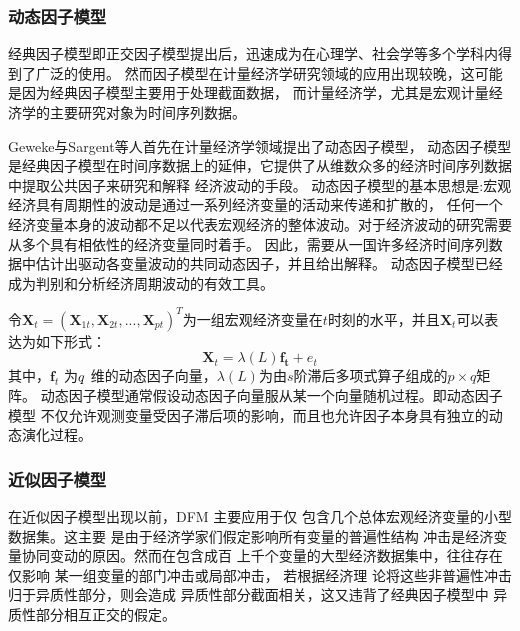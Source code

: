 
\subsubsection{动态因子模型}

经典因子模型即正交因子模型提出后，迅速成为在心理学、社会学等多个学科内得到了广泛的使用。
然而因子模型在计量经济学研究领域的应用出现较晚，这可能是因为经典因子模型主要用于处理截面数据，
而计量经济学，尤其是宏观计量经济学的主要研究对象为时间序列数据。

Geweke与Sargent等人首先在计量经济学领域提出了动态因子模型，
动态因子模型是经典因子模型在时间序数据上的延伸，它提供了从维数众多的经济时间序列数据中提取公共因子来研究和解释
经济波动的手段。
动态因子模型的基本思想是:宏观经济具有周期性的波动是通过一系列经济变量的活动来传递和扩散的，
任何一个经济变量本身的波动都不足以代表宏观经济的整体波动。对于经济波动的研究需要从多个具有相依性的经济变量同时着手。
因此，需要从一国许多经济时间序列数据中估计出驱动各变量波动的共同动态因子，并且给出解释。
动态因子模型已经成为判别和分析经济周期波动的有效工具。

令$\bm{X}_t = (\bm{X}_{1t},\bm{X}_{2t}, ..., \bm{X}_{pt})^T$为一组宏观经济变量在$t$时刻的水平，并且$\bm{X}_t$可以表达为如下形式：
\begin{equation}
    \bm{X}_t = \lambda(L)\bm{f_t} + e_t
\end{equation}
其中，$\bm{f}_t$ 为$q\time 1$ 维的动态因子向量，$\lambda(L)$为由$s$阶滞后多项式算子组成的$p \times q$矩阵。
动态因子模型通常假设动态因子向量服从某一个向量随机过程。即动态因子模型
不仅允许观测变量受因子滞后项的影响，而且也允许因子本身具有独立的动态演化过程。

\subsubsection{近似因子模型}
在近似因子模型出现以前，DFM 主要应用于仅 包含几个总体宏观经济变量的小型数据集。这主要 是由于经济学家们假定影响所有变量的普遍性结构
冲击是经济变量协同变动的原因。然而在包含成百 上千个变量的大型经济数据集中，往往存在仅影响 某一组变量的部门冲击或局部冲击，
若根据经济理 论将这些非普遍性冲击归于异质性部分，则会造成 异质性部分截面相关，这又违背了经典因子模型中 异质性部分相互正交的假定。

